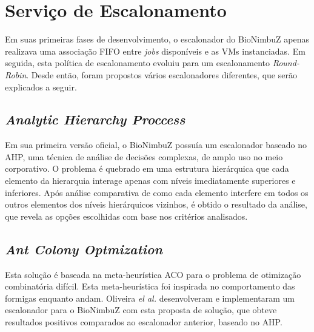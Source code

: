 \section{Serviço de Escalonamento}

Em suas primeiras fases de desenvolvimento, o escalonador do BioNimbuZ apenas realizava uma associação \acrfull{FIFO} entre \textit{jobs} disponíveis e as \acrshort{VM}s instanciadas. Em seguida, esta política de escalonamento evoluiu para um escalonamento \textit{Round-Robin}. Desde então, foram propostos vários escalonadores diferentes, que serão explicados a seguir.

\subsection{\textit{Analytic Hierarchy Proccess}}
Em sua primeira versão oficial, o BioNimbuZ possuía um escalonador baseado no \acrfull{AHP}\cite{6732620_BioNimbuZ_ACOsched}, uma técnica de análise de decisões complexas, de amplo uso no meio corporativo. O problema é quebrado em uma estrutura hierárquica que cada elemento da hierarquia interage apenas com níveis imediatamente superiores e inferiores. Após análise comparativa de como cada elemento interfere em todos os outros elementos dos níveis hierárquicos vizinhos, é obtido o resultado da análise, que revela as opções escolhidas com base nos critérios analisados.

\subsection{\textit{Ant Colony Optmization}}
Esta solução é baseada na meta-heurística \acrfull{ACO}\cite{ACO_DORIGO2005243} para o problema de otimização combinatória difícil. Esta meta-heurística foi inspirada no comportamento das formigas enquanto andam. Oliveira \textit{el al.}\cite{6732620_BioNimbuZ_ACOsched} desenvolveram e implementaram um escalonador para o BioNimbuZ com esta proposta de solução, que obteve resultados positivos comparados ao escalonador anterior, baseado no \acrshort{AHP}.

